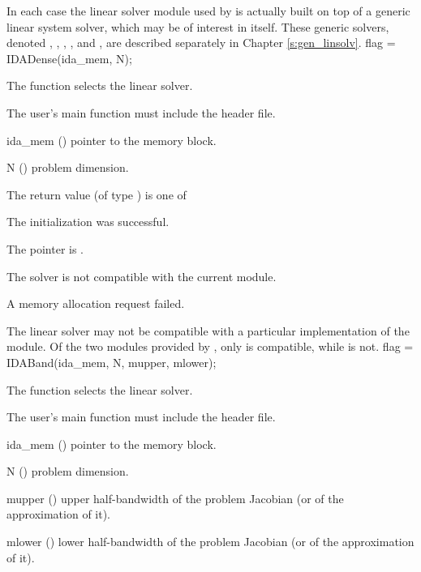 In each case the linear
solver module used by {\ida} is actually built on top of a generic
linear system solver, which may be of interest in itself.  These
generic solvers, denoted {\dense}, {\band}, {\spgmr}, {\spbcg}, and {\sptfqmr}, are
described separately in Chapter \ref{s:gen_linsolv}.
{
  flag = IDADense(ida\_mem, N);
}
{
  The function  selects the {\idadense} linear solver. 

  The user's main function must include the  header file.
}
{
  \begin{args}
  \item[ida\_mem] ()
    pointer to the {\ida} memory block.
  \item[N] ()
    problem dimension.
  \end{args}
}
{
  The return value  (of type ) is one of
  \begin{args}
  \item[\Id{IDADENSE\_SUCCESS}] 
    The {\idadense} initialization was successful.
  \item[\Id{IDADENSE\_MEM\_NULL}]
    The  pointer is .
  \item[\Id{IDADENSE\_ILL\_INPUT}]
    The {\idadense} solver is not compatible with the current {\nvector} module.
  \item[\Id{IDADENSE\_MEM\_FAIL}]
    A memory allocation request failed.
  \end{args}
}
{
  The {\idadense} linear solver may not be compatible with a particular
  implementation of the {\nvector} module. 
  Of the two {\nvector} modules provided by {\sundials}, only {\nvecs} is 
  compatible, while {\nvecp} is not.
}
{
  flag = IDABand(ida\_mem, N, mupper, mlower);
}
{
  The function  selects the {\idaband} linear solver. 

  The user's main function must include the  header file.
}
{
  \begin{args}
  \item[ida\_mem] ()
    pointer to the {\ida} memory block.
  \item[N] ()
    problem dimension.
  \item[mupper] ()
    upper half-bandwidth of the problem Jacobian (or of the approximation of it).
  \item[mlower] ()
    lower half-bandwidth of the problem Jacobian (or of the approximation of it).
  \end{args}
}
